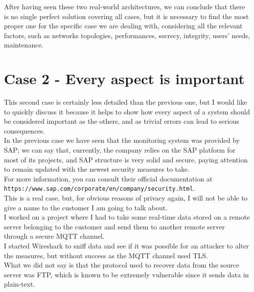 \documentclass[12pt]{report}
\begin{document}
{\bigskip

After having seen these two real-world architectures, we can conclude that there is no single perfect solution covering all cases, but it is necessary to find the most proper one for the specific case we are dealing with, considering all the relevant factors, such as networks topologies, performances, secrecy, integrity, users' needs, maintenance.\\



\section{Case 2 - Every aspect is important }
\bigskip
This second case is certainly less detailed than the previous one, but I would like to quickly discuss it because it helps to show how every aspect of a system should be considered important as the others, and as trivial errors can lead to serious consequences.\\

In the previous case we have seen that the monitoring system was provided by SAP; we can say that, currently, the company relies on the SAP platform for most of its projects, and SAP structure is very solid and secure, paying attention to remain updated with the newest security measures to take.\\
For more information, you can consult their official documentation at \\ \texttt{https://www.sap.com/corporate/en/company/security.html}.\\

This is a real case, but, for obvious reasons of privacy again, I will not be able to give a name to the customer I am going to talk about.\\

I worked on a project where I had to take some real-time data stored on a remote server belonging to the customer and send them to another remote server through a secure MQTT channel.\\
I started Wireshark to sniff data and see if it was possible for an attacker to alter the measures, but without success as the MQTT channel used TLS.\\

What we did not say is that the protocol used to recover data from the source server was FTP, which is known to be extremely vulnerable since it sends data in plain-text.\\


}
\end{document}
